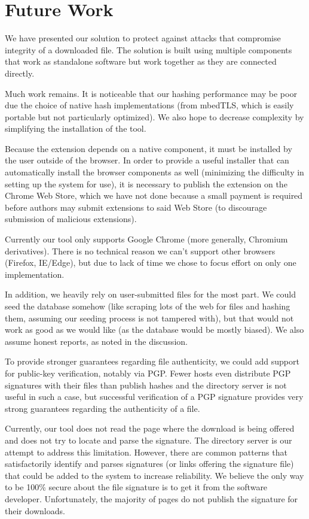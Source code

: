 \documentclass[letterpaper,twocolumn,10pt]{article}
\begin{document}
\section{Future Work}

We have presented our solution to protect against attacks that compromise integrity of a downloaded file. The solution is built using multiple components that work as standalone software but work together as they are connected directly.

Much work remains. It is noticeable that our hashing performance may be poor due the choice of native hash implementations (from mbedTLS, which is easily portable but not particularly optimized). We also hope to decrease complexity by simplifying the installation of the tool.

Because the extension depends on a native component, it must be installed by the user
outside of the browser. In order to provide a useful installer
that can automatically install the browser components as well (minimizing the
difficulty in setting up the system for use), it is necessary to publish the extension
on the Chrome Web Store, which we have not done because a small payment is required
before authors may submit extensions to said Web Store (to discourage
submission of malicious extensions).

Currently our tool only supports Google Chrome (more generally, Chromium derivatives). There is no technical reason we can't support other browsers (Firefox, IE/Edge), but due to lack of time we chose to focus effort on only one implementation.

In addition, we heavily rely on user-submitted files for the most part. We could seed the database somehow (like scraping lots of the web for files and hashing them, assuming our seeding process is not tampered with), but that would not work as good as we would like (as the database would be mostly biased). We also assume honest reports, as noted in the discussion.

To provide stronger guarantees regarding file authenticity, we could add support for
public-key verification, notably via PGP. Fewer hosts even distribute PGP signatures with
their files than publish hashes and the directory server is not useful in such a case,
but successful verification of a PGP signature provides
very strong guarantees regarding the authenticity of a file.

Currently, our tool does not read the page where the download is being offered and does not try to locate and parse the signature. The directory server is our attempt to address this limitation. However, there are common patterns that satisfactorily identify and parses signatures (or links offering the signature file) that could be added to the system to increase reliability. We believe the only way to be 100\% secure about the file signature is to get it from the software developer. Unfortunately, the majority of pages do not publish the signature for their downloads.

{\footnotesize 
}
\end{document}
